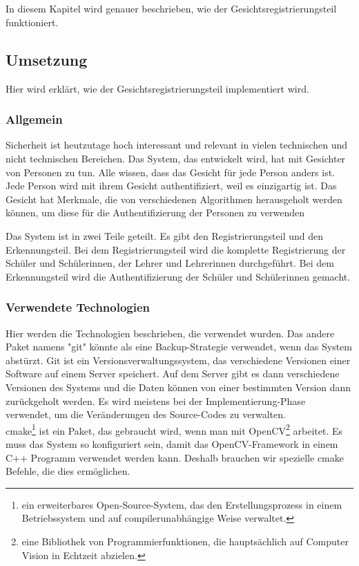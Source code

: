\chapter{\docname}
In diesem Kapitel wird genauer beschrieben, wie der Gesichtsregistrierungsteil funktioniert.
\label{\docname}
\section{Umsetzung}
Hier wird erkl\"art, wie der Gesichtsregistrierungsteil implementiert wird. 
\subsection{Allgemein}
Sicherheit ist heutzutage hoch interessant und relevant in vielen technischen und nicht technischen Bereichen. Das System, das entwickelt wird, hat mit Gesichter von Personen zu tun. Alle wissen, dass das Gesicht f\"ur jede Person anders ist. Jede Person wird mit ihrem Gesicht authentifiziert, weil es einzigartig ist. Das Gesicht hat Merkmale, die von verschiedenen Algorithmen herausgeholt werden k\"onnen, um diese f\"ur die Authentifizierung der Personen zu verwenden 

Das System ist in zwei Teile geteilt. Es gibt den Registrierungsteil und den Erkennungsteil. Bei dem Registrierungsteil wird die komplette Registrierung der Sch\"uler und Sch\"ulerinnen, der Lehrer und Lehrerinnen durchgef\"uhrt. Bei dem Erkennungsteil wird die Authentifizierung der Sch\"uler und Sch\"ulerinnen gemacht. 
\subsection{Verwendete Technologien}
Hier werden die Technologien beschrieben, die verwendet wurden.
Das andere Paket namens "git" k\"onnte als eine Backup-Strategie verwendet, wenn das System abst\"urzt. Git ist ein Versionsverwaltungssystem, das verschiedene Versionen einer Software auf einem Server speichert. Auf dem Server gibt es dann verschiedene Versionen des Systems und die Daten k\"onnen von einer bestimmten Version dann zur\"uckgeholt werden. Es wird meistens bei der Implementierung-Phase verwendet, um die Ver\"anderungen des Source-Codes zu verwalten. \\
cmake\footnote{ein erweiterbares Open-Source-System, das den Erstellungsprozess in einem Betriebssystem und auf compilerunabhängige Weise verwaltet.} ist ein Paket, das gebraucht wird, wenn man mit OpenCV\footnote{eine Bibliothek von Programmierfunktionen, die hauptsächlich auf Computer Vision in Echtzeit abzielen.} arbeitet. Es muss das System so konfiguriert sein, damit das OpenCV-Framework in einem C++ Programm verwendet werden kann. Deshalb brauchen wir spezielle cmake Befehle, die dies erm\"oglichen.

